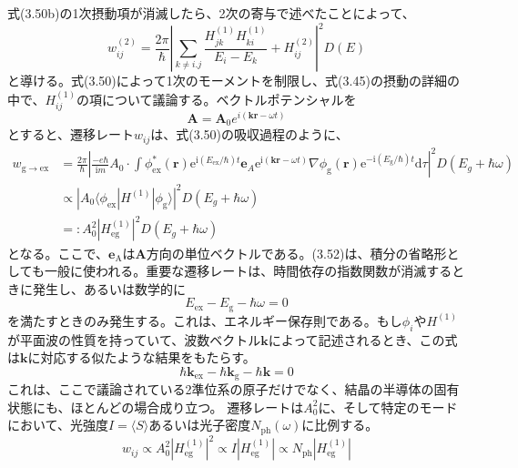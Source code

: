 \documentclass[11pt,a4j,uplatex]{jsarticle}
\begin{document}
式(3.50b)の1次摂動項が消滅したら、2次の寄与で述べたことによって、
\begin{equation}
  w_{ij}^{(2)}=\frac{2\pi}{\hbar}\left|\sum_{k\not=i.j}\frac{H_{jk}^{(1)}H_{ki}^{(1)}}{E_i-E_k}+H_{ij}^{(2)}\right|^2D(E)\tag{3.51}
\end{equation}
と導ける。式(3.50)によって1次のモーメントを制限し、式(3.45)の摂動の詳細の中で、$H_{ij}^{(1)}$の項について議論する。ベクトルポテンシャルを
\begin{equation}
  \bm{A}=\bm{A}_{\mathrm{0}}e^{i(\bm{kr}-\omega t)}\tag{3.52a}
\end{equation}
とすると、遷移レート$w_{ij}$は、式(3.50)の吸収過程のように、
\begin{equation}\tag{3.52b}
  \begin{split}
    w_{\mathrm{g\to ex}}&=\frac{2\pi}{\hbar}\left|\frac{-e\hbar}{\mathrm{i}m}A_0\cdot \int\phi_{\mathrm{ex}}^*(\bm{r})\mathrm{e}^{\mathrm{i}(E_\mathrm{ex}/\hbar)t}\bm{e}_A\mathrm{e}^{\mathrm{i}(\bm{kr}-\omega t)}\nabla\phi_{\mathrm{g}}(\bm{r})\mathrm{e}^{-\mathrm{i}(E_\mathrm{g}/\hbar)t}\mathrm{d}\tau\right|^2D(E_{g}+\hbar\omega)\\
    &\propto\left|A_0\langle\phi_{\mathrm{ex}}|H^{(1)}|\phi_{\mathrm{g}}\rangle\right|^2D(E_{g}+\hbar\omega)\\
    &=:A_0^2\left|H_{\mathrm{eg}}^{(1)}\right|^2D(E_{g}+\hbar\omega)
  \end{split}
\end{equation}
となる。ここで、$\bm{e}_{\mathrm{A}}$は$\bm{A}$方向の単位ベクトルである。(3.52)は、積分の省略形としても一般に使われる。重要な遷移レートは、時間依存の指数関数が消滅するときに発生し、あるいは数学的に
\begin{equation}
  E_{\mathrm{ex}}-E_{\mathrm{g}}-\hbar\omega=0\tag{3.53a}
\end{equation}
を満たすときのみ発生する。これは、エネルギー保存則である。もし$\phi_i$や$H^{(1)}$が平面波の性質を持っていて、波数ベクトル$\bm{k}$によって記述されるとき、この式は$\bm{k}$に対応する似たような結果をもたらす。
\begin{equation}
  \hbar\bm{k}_{\mathrm{ex}}-\hbar\bm{k}_{\mathrm{g}}-\hbar\bm{k}=0\tag{3.53b}
\end{equation}
これは、ここで議論されている2準位系の原子だけでなく、結晶の半導体の固有状態にも、ほとんどの場合成り立つ。
遷移レートは$A_0^2$に、そして特定のモードにおいて、光強度$I=\langle S\rangle$あるいは光子密度$N_{\mathrm{ph}}(\omega)$に比例する。
\begin{equation}
  w_{ij}\propto A_0^2\left|H_{\mathrm{eg}}^{(1)}\right|^2\propto I\left|H_{\mathrm{eg}}^{(1)}\right|\propto N_{\mathrm{ph}}\left|H_{\mathrm{eg}}^{(1)}\right|\tag{3.54}
\end{equation}
\end{document}
